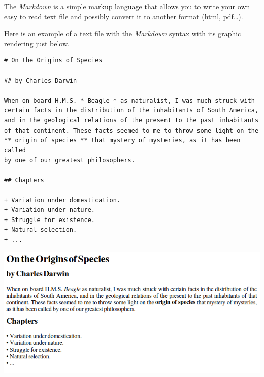 \documentclass[11pt,class=report,crop=false]{standalone}
\begin{document}

\begin{cours}[Markdown]
The \emph{Markdown} is a simple markup language that allows you to write your own easy to read text file and possibly convert it to another format (html, pdf\ldots).

Here is an example of a text file with the \emph{Markdown} syntax with its graphic rendering just below.
\begin{center}
\footnotesize
\begin{minipage}{0.7\textwidth}
\begin{verbatim}
# On the Origins of Species

## by Charles Darwin

When on board H.M.S. * Beagle * as naturalist, I was much struck with 
certain facts in the distribution of the inhabitants of South America, 
and in the geological relations of the present to the past inhabitants 
of that continent. These facts seemed to me to throw some light on the 
** origin of species ** that mystery of mysteries, as it has been called 
by one of our greatest philosophers.

## Chapters

+ Variation under domestication.
+ Variation under nature.
+ Struggle for existence.
+ Natural selection. 
+ ...
\end{verbatim}
\end{minipage}
\end{center}
\begin{center}
\includegraphics[scale=0.6]{screen-markdown-1-en}
\end{center}



\end{cours}
\end{document}
